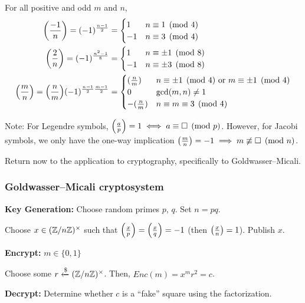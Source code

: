 \documentclass[notes]{agony}
\newcommand{\xgets}{\xleftarrow}
\newcommand{\leg}[2]{\qty(\frac{#1}{#2})}
\begin{document}
\begin{theorem}[Jacobi]
  For all positive and odd $m$ and $n$,
  \begin{align*}
    \qty(\frac{-1}{n}) = (-1)^{\frac{n-1}{2}}
     & = \begin{cases}1 & n \equiv 1 \pmod 4 \\ -1 & n \equiv 3 \pmod 4\end{cases}         \\
    \qty(\frac{2}{n})  = (-1)^{\frac{n^2-1}{8}}
     & = \begin{cases}1 & n \equiv \pm 1 \pmod 8 \\ -1 & n \equiv \pm 3 \pmod 8\end{cases} \\
    \qty(\frac{m}{n})  = \qty(\frac{n}{m})(-1)^{\frac{n-1}{2}\frac{m-1}{2}}
     & = \begin{cases}
           (\frac{n}{m})  & n \equiv \pm 1 \pmod 4 \text{ or } m \equiv \pm 1 \pmod 4 \\
           0              & \gcd(m,n) \neq 1                                          \\
           -(\frac{n}{m}) & n \equiv m \equiv 3 \pmod 4
         \end{cases}
  \end{align*}
\end{theorem}

Note: For Legendre symbols, $\leg{a}{p} = 1 \iff a \equiv \square \pmod p$.
However, for Jacobi symbols, we only have the one-way implication
$\leg{m}{n} = -1 \implies m \not\equiv \square \pmod n$.

Return now to the application to cryptography,
specifically to Goldwasser--Micali.

\subsubsection{Goldwasser--Micali cryptosystem}

\textbf{Key Generation: } Choose random primes $p$, $q$. Set $n = pq$.

Choose $x \in (\mathbb{Z}/n\mathbb{Z})^\times$ such that
$\leg{x}{p} = \leg{x}{q} = -1$ (then $\leg{x}{n} = 1$).
Publish $x$.

\textbf{Encrypt:} $m \in \{0,1\}$

Choose some $r \xgets{\$} (\Z/n\Z)^\times$.
Then, $Enc(m) = x^m r^2 = c$.

\textbf{Decrypt:} Determine whether $c$ is a ``fake'' square using the factorization.
\end{document}
